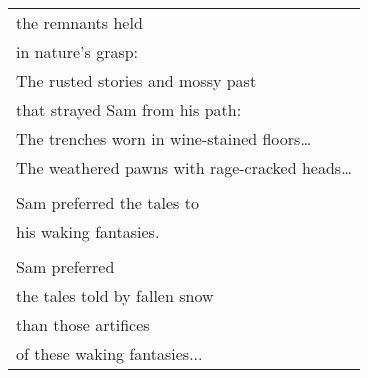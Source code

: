 \documentclass{article}
\begin{document}
\begin{center}
\begin{tabular}{l}
the remnants held \\
in nature's grasp: \\
The rusted stories and mossy past \\
that strayed Sam from his path: \\
The trenches worn in wine-stained floors\ldots \\
The weathered pawns with rage-cracked heads\ldots \\
\\
Sam preferred the tales to \\
his waking fantasies. \\
\\
Sam preferred \\
the tales told by fallen snow \\
than those artifices \\
of these waking fantasies...

\end{tabular}
\end{center}
\end{document}

